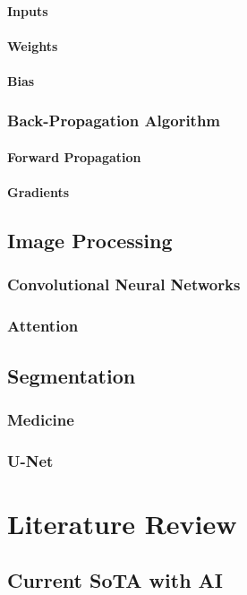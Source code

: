 \documentclass{book}
\begin{document}
      \subsubsection{Inputs}
      \subsubsection{Weights}
      \subsubsection{Bias}
    \subsection{Back-Propagation Algorithm}
      \subsubsection{Forward Propagation}
      \subsubsection{Gradients}
  \section{Image Processing}
    \subsection{Convolutional Neural Networks}
    \subsection{Attention}
  \section{Segmentation}
    \subsection{Medicine}
    \subsection{U-Net}

\chapter{Literature Review}
  \section{Current SoTA with AI}
\end{document}
